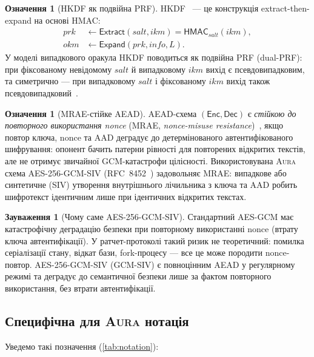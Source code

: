 \documentclass[11pt,a4paper]{article}
\theoremstyle{definition}
\newtheorem{definition}[theorem]{Означення}
\newtheorem{remark}[theorem]{Зауваження}
\newcommand{\HMAC}{\textsf{HMAC}}
\newcommand{\AEAD}{\textsf{AES-256-GCM-SIV}}
\newcommand{\Enc}{\textsf{Enc}}
\newcommand{\Dec}{\textsf{Dec}}
\newcommand{\MRAE}{\textsf{MRAE}}
\newcommand{\dualPRF}{\textsf{dual-PRF}}
\newcommand{\Aura}{\mbox{\normalfont\scshape Aura}}
\begin{document}
\begin{definition}[HKDF як подвійна PRF]
\label{def:hkdf}
HKDF~\cite{rfc5869} — це конструкція extract-then-expand на основі HMAC:
\begin{align}
  \mathit{prk} &\gets \mathsf{Extract}(\mathit{salt}, \mathit{ikm}) = \HMAC_{\mathit{salt}}(\mathit{ikm}), \label{eq:hkdf-extract}\\
  \mathit{okm} &\gets \mathsf{Expand}(\mathit{prk}, \mathit{info}, L). \label{eq:hkdf-expand}
\end{align}
У моделі випадкового оракула HKDF поводиться як подвійна PRF
(\dualPRF{}): при фіксованому невідомому $\mathit{salt}$ й випадковому
$\mathit{ikm}$ вихід є псевдовипадковим, та симетрично — при
випадковому $\mathit{salt}$ і фіксованому $\mathit{ikm}$ вихід також
псевдовипадковий~\cite{krawczyk2010}.
\end{definition}

\begin{definition}[MRAE-стійке AEAD]
\label{def:mrae}
AEAD-схема $(\Enc, \Dec)$ є \emph{стійкою до повторного використання
nonce} (\MRAE{}, \emph{nonce-misuse resistance})~\cite{rogaway2006},
якщо повтор ключа, nonce та AAD деградує до детермінованого
автентифікованого шифрування: опонент бачить патерни рівності для
повторених відкритих текстів, але не отримує звичайної GCM-катастрофи
цілісності.
Використовувана \Aura{} схема \AEAD{} (RFC~8452~\cite{rfc8452}) задовольняє
MRAE: випадкове або синтетичне (SIV) утворення внутрішнього лічильника
з ключа та AAD робить шифротекст ідентичним лише при ідентичних
відкритих текстах.
\end{definition}

\begin{remark}[Чому саме \AEAD{}]
Стандартний AES-GCM має катастрофічну деградацію безпеки при повторному
використанні nonce (втрату ключа автентифікації). У ратчет-протоколі
такий ризик не теоретичний: помилка серіалізації стану, відкат бази,
fork-процесу — все це може породити nonce-повтор. \AEAD{} (GCM-SIV) є
повноцінним AEAD у регулярному режимі та деградує до семантичної
безпеки лише за фактом повторного використання, без втрати
автентифікації.
\end{remark}

\subsection{Специфічна для \Aura{} нотація}\label{sec:aura-notation}

Уведемо такі позначення (\cref{tab:notation}):
\end{document}
